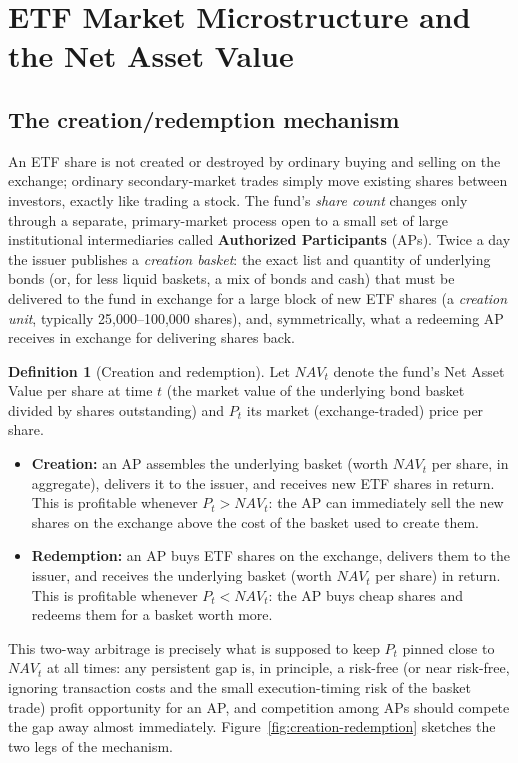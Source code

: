 \documentclass[11pt]{article}
\theoremstyle{definition}
\newtheorem{definition}[theorem]{Definition}
\theoremstyle{remark}
\begin{document}
\section{ETF Market Microstructure and the Net Asset Value}
\label{sec:etf}

\subsection{The creation/redemption mechanism}

An ETF share is not created or destroyed by ordinary buying and selling on the exchange; ordinary secondary-market trades simply move existing shares between investors, exactly like trading a stock. The fund's \emph{share count} changes only through a separate, primary-market process open to a small set of large institutional intermediaries called \textbf{Authorized Participants} (APs). Twice a day the issuer publishes a \emph{creation basket}: the exact list and quantity of underlying bonds (or, for less liquid baskets, a mix of bonds and cash) that must be delivered to the fund in exchange for a large block of new ETF shares (a \emph{creation unit}, typically 25,000--100,000 shares), and, symmetrically, what a redeeming AP receives in exchange for delivering shares back.

\begin{definition}[Creation and redemption]
Let $NAV_t$ denote the fund's Net Asset Value per share at time $t$ (the market value of the underlying bond basket divided by shares outstanding) and $P_t$ its market (exchange-traded) price per share.
\begin{itemize}
    \item \textbf{Creation:} an AP assembles the underlying basket (worth $NAV_t$ per share, in aggregate), delivers it to the issuer, and receives new ETF shares in return. This is profitable whenever $P_t>NAV_t$: the AP can immediately sell the new shares on the exchange above the cost of the basket used to create them.
    \item \textbf{Redemption:} an AP buys ETF shares on the exchange, delivers them to the issuer, and receives the underlying basket (worth $NAV_t$ per share) in return. This is profitable whenever $P_t<NAV_t$: the AP buys cheap shares and redeems them for a basket worth more.
\end{itemize}
\end{definition}

This two-way arbitrage is precisely what is supposed to keep $P_t$ pinned close to $NAV_t$ at all times: any persistent gap is, in principle, a risk-free (or near risk-free, ignoring transaction costs and the small execution-timing risk of the basket trade) profit opportunity for an AP, and competition among APs should compete the gap away almost immediately. Figure~\ref{fig:creation-redemption} sketches the two legs of the mechanism.
\end{document}
